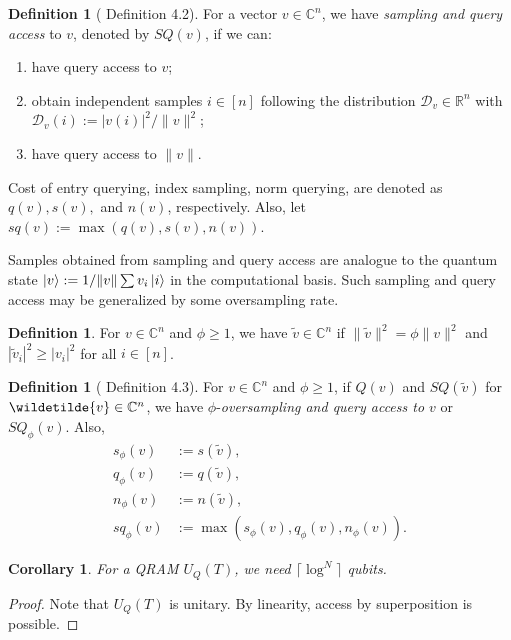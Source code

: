 \documentclass[10pt,twoside,reqno]{amsart} %
\theoremstyle{plain}
\newtheorem{cor}[thm]{Corollary}
\theoremstyle{definition}
\newtheorem{defn}[thm]{Definition}
\begin{document}
\begin{defn}[\cite{tang2023} Definition 4.2]
  For a vector $v\in\mathbb{C}^n$, we have \emph{sampling and query access} to
  $v$, denoted by $SQ(v)$, if we can:
  \begin{enumerate}
    \item have query access to $v$;
    \item obtain independent samples $i\in[n]$ following the distribution
      $\mathcal{D}_v\in\mathbb{R}^n$ with $\mathcal{D}_v(i):=|v(i)|^2/\|v\|^2$;
    \item have query access to $\|v\|$.
  \end{enumerate}
  Cost of entry querying, index sampling, norm querying, are denoted as
  $q(v),s(v),$ and $n(v)$, respectively. Also, let $sq(v):=\max(q(v),s(v),n(v))$.
\end{defn}
Samples obtained from sampling and query access are analogue to the quantum
state $\ket{v} := 1/\|v\|\sum v_i\ket{i}$ in the computational basis. Such
sampling and query access may be generalized by some oversampling rate.
\begin{defn}
  For $v\in\mathbb{C}^n$ and $\phi\geq1$, we have
  $\widetilde{v}\in\mathbb{C}^n$ if $\|\widetilde{v}\|^2=\phi\|v\|^2$ and
  $|\widetilde{v}_i|^2\geq |v_i|^2$ for all $i\in[n]$.
\end{defn}
\begin{defn}[\cite{tang2023} Definition 4.3]
  For $v\in\mathbb{C}^n$ and $\phi\geq1$, if $Q(v)$ and 
  $SQ(\widetilde{v})$ for $\wildetilde{v}\in\mathbb{C}^n$, we have 
  $\phi$-\emph{oversampling and query access to $v$} or $SQ_{\phi}(v)$. Also,
  \begin{align*}
    s_{\phi}(v) &:= s(\widetilde{v}),\\
    q_{\phi}(v) &:= q(\widetilde{v}),\\
    n_{\phi}(v) &:= n(\widetilde{v}),\\
    sq_{\phi}(v) &:= \max(s_{\phi}(v),q_{\phi}(v),n_{\phi}(v)).
  \end{align*}
\end{defn}
\begin{cor}
  For a QRAM $U_Q(T)$, we need $\lceil\log^N\rceil$ qubits.
\end{cor}
\begin{proof}
  Note that $U_Q(T)$ is unitary. By linearity, access by superposition is
  possible. 
\end{proof}
\end{document}
